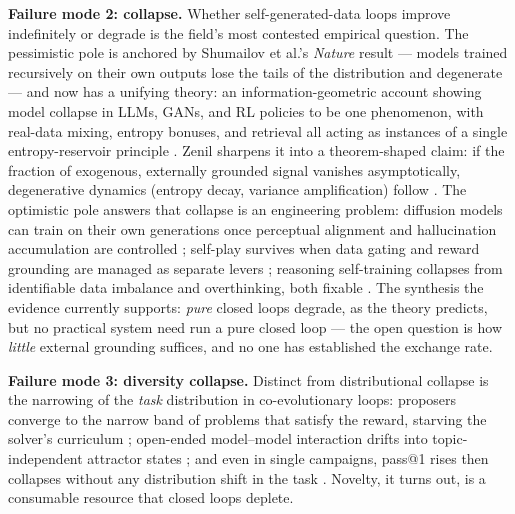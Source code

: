 \documentclass[
  11pt,
]{article}
\begin{document}
\textbf{Failure mode 2: collapse.} Whether self-generated-data loops
improve indefinitely or degrade is the field's most contested empirical
question. The pessimistic pole is anchored by Shumailov et al.'s
\emph{Nature} result --- models trained recursively on their own outputs
lose the tails of the distribution and degenerate
\citep{shumailov2024collapse} --- and now has a unifying theory: an
information-geometric account showing model collapse in LLMs, GANs, and
RL policies to be one phenomenon, with real-data mixing, entropy
bonuses, and retrieval all acting as instances of a single
entropy-reservoir principle \citep{jingwei2025entropy}. Zenil sharpens
it into a theorem-shaped claim: if the fraction of exogenous, externally
grounded signal vanishes asymptotically, degenerative dynamics (entropy
decay, variance amplification) follow \citep{zenil2026limits}. The
optimistic pole answers that collapse is an engineering problem:
diffusion models can train on their own generations once perceptual
alignment and hallucination accumulation are controlled
\citep{zhang2025generating}; self-play survives when data gating and
reward grounding are managed as separate levers \citep{pu2026survive};
reasoning self-training collapses from identifiable data imbalance and
overthinking, both fixable \citep{zhong2026better}. The synthesis the
evidence currently supports: \emph{pure} closed loops degrade, as the
theory predicts, but no practical system need run a pure closed loop ---
the open question is how \emph{little} external grounding suffices, and
no one has established the exchange rate.

\textbf{Failure mode 3: diversity collapse.} Distinct from
distributional collapse is the narrowing of the \emph{task} distribution
in co-evolutionary loops: proposers converge to the narrow band of
problems that satisfy the reward, starving the solver's curriculum
\citep{dineen2026vocabulary}; open-ended model--model interaction drifts
into topic-independent attractor states \citep{ko2026attractor}; and
even in single campaigns, pass@1 rises then collapses without any
distribution shift in the task \citep{lin2026self}. Novelty, it turns
out, is a consumable resource that closed loops deplete.
\end{document}

